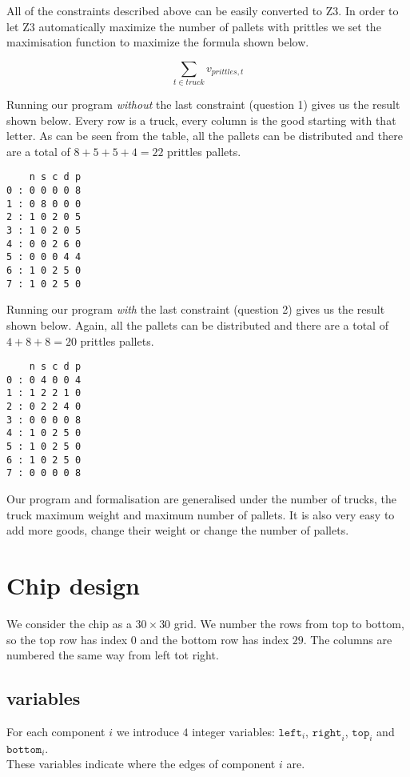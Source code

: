 \documentclass{scrartcl}
\begin{document}
All of the constraints described above can be easily converted to Z3. In order
to let Z3 automatically maximize the number of pallets with prittles we set the
maximisation function to maximize the formula shown below.

\[ \sum_{t \in truck} v_{prittles,t} \]

Running our program \textit{without} the last constraint (question 1) gives us
the result shown below. Every row is a truck, every column is the good starting
with that letter. As can be seen from the table, all the pallets can be
distributed and there are a total of $8 + 5 + 5 + 4 = 22$ prittles pallets.
\begin{verbatim}
    n s c d p
0 : 0 0 0 0 8
1 : 0 8 0 0 0
2 : 1 0 2 0 5
3 : 1 0 2 0 5
4 : 0 0 2 6 0
5 : 0 0 0 4 4
6 : 1 0 2 5 0
7 : 1 0 2 5 0
\end{verbatim}

Running our program \textit{with} the last constraint (question 2) gives us the
result shown below. Again, all the pallets can be distributed and there are a
total of $4 + 8 + 8 = 20$ prittles pallets.

\begin{verbatim}
    n s c d p
0 : 0 4 0 0 4
1 : 1 2 2 1 0
2 : 0 2 2 4 0
3 : 0 0 0 0 8
4 : 1 0 2 5 0
5 : 1 0 2 5 0
6 : 1 0 2 5 0
7 : 0 0 0 0 8
\end{verbatim}

Our program and formalisation are generalised under the number of trucks, the
truck maximum weight and maximum number of pallets. It is also very easy to add
more goods, change their weight or change the number of pallets.

\section{Chip design}

We consider the chip as a $30\times30$ grid. We number the rows from top to bottom, so the top row has index $0$ and the bottom row has index $29$. The columns are numbered the same way from left tot right.

\subsection{variables} %
\label{sub:chip_variables}
	For each component $i$ we introduce $4$ integer variables: $\mathtt{left}_i$, $\mathtt{right}_i$, $\mathtt{top}_i$ and $\mathtt{bottom}_i$.\\
	These variables indicate where the edges of component $i$ are.\\
\end{document}
